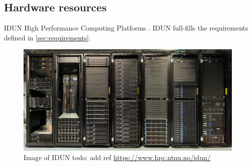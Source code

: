 \subsection{Hardware resources}
\label{sec:hardware-resources}

IDUN High Performance Computing Platforms \cite{epic}.
IDUN full-fills the requirements defined in \cref{sec:requirements}.

\begin{figure}[htp]
    \centering
    \includegraphics[width=\textwidth]{figures/idun.jpeg}
    \caption{Image of IDUN todo: add ref \url{https://www.hpc.ntnu.no/idun/}}
    \label{fig:flowchart}
\end{figure}
